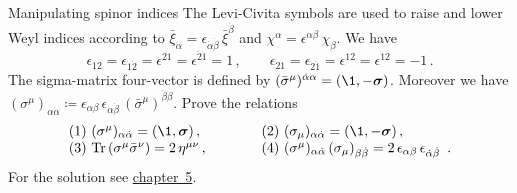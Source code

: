 \begin{exer}{Manipulating spinor indices}
\label{Ex:1.1}
The Levi-Civita symbols are used to raise and lower Weyl indices according to
$\bar\xi_{\dot\alpha}=\epsilon_{\dot\alpha\dot\beta} \, \bar\xi^{\dot\beta}$ and
$\chi^{\alpha}=\epsilon^{\alpha\beta}\, \chi_{\beta}$. We have
$$
\epsilon_{12}=\epsilon_{\dot 1\dot 2}=\epsilon^{21}=\epsilon^{\dot 2\dot 1}=1\, ,\qquad
\epsilon_{21}=\epsilon_{\dot 2\dot 1}=\epsilon^{12}=\epsilon^{\dot 1\dot 2}=-1\, .
$$
The sigma-matrix four-vector is defined by $(\bar\sigma^{\mu})^{\dot\alpha\alpha}=(\1,-\vec\sigma)$.
Moreover we have $(\sigma^{\mu})_{\alpha\dot\alpha}\coloneqq
\epsilon_{\alpha\beta}\, \epsilon_{\dot\alpha\dot\beta}\, (\bar\sigma^{\mu})^{\dot\beta\beta}$.
Prove the relations
\begin{align*}
\begin{array}{ll}
(1) \ (\sigma^{\mu})_{\alpha\dot\alpha}=(\1,\vec\sigma)\,, &
(2) \ (\sigma_{\mu})_{\alpha\dot\alpha}=(\1,-\vec\sigma)\,, \\
(3) \ \tr{\sigma^{\mu} \bar\sigma^{\nu}} = 2 \, \eta^{\mu \nu}\,, \quad \quad \quad & 
(4) \ (\sigma^{\mu})_{\alpha\dot\alpha}\, (\sigma_{\mu})_{\beta\dot\beta} = 2\,\epsilon_{\alpha\beta}\,
 \epsilon_{\dot\alpha\dot\beta}\  \,. 
 \end{array}
\end{align*}
For the solution see \hyperref[Prob:1.1]{chapter~5}.
\end{exer}

\vspace{-0.4cm}

